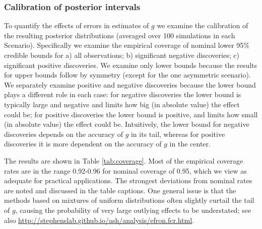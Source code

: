 \documentclass[11pt]{article}
\begin{document}
\subsubsection*{Calibration of posterior intervals}

To quantify the effects of errors in estimates of $g$ we examine the calibration of the resulting posterior distributions (averaged over 100 simulations in each Scenario). 
Specifically we examine the empirical coverage of nominal lower 95\% credible bounds for a) all observations; b) significant negative discoveries; c) significant positive discoveries.  We examine only lower bounds because the results for upper bounds follow by 
symmetry (except for the one asymmetric scenario). We separately examine positive and negative discoveries because the lower bound plays a different role
in each case: for negative discoveries the lower bound is typically large and negative and limits how big (in absolute value) 
the effect could be; for positive discoveries the lower bound 
is positive, and limits how small (in absolute value) the effect could be. Intuitively, the lower bound for negative discoveries depends on the accuracy of $g$ in its tail,
whereas for positive discoveries it is more dependent on the accuracy of $g$ in the center.

The results are shown in Table \ref{tab:coverage}.  Most of the empirical coverage rates are in the range 0.92-0.96 for nominal coverage of 0.95, which we view
as adequate for practical applications. The strongest deviations from nominal rates are noted and discussed in the table captions.
One general issue is that the methods based on mixtures of uniform distributions often slightly curtail the tail of $g$, causing the probability of very large outlying effects to be understated;  see also \url{http://stephenslab.github.io/ash/analysis/efron.fcr.html}. 

\end{document}
